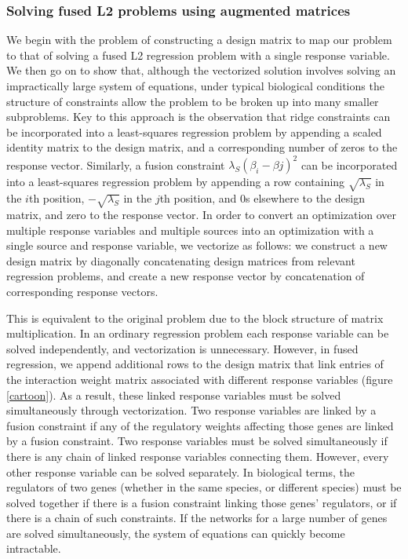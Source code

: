 \documentclass[11pt]{article}
\begin{document}
\subsubsection{Solving fused L2 problems using augmented matrices}
We begin with the problem of constructing a design matrix to map our problem to that of solving a fused L2 regression problem with a single response variable. 
We then go on to show that, although the vectorized solution involves solving an impractically large system of equations, under typical biological conditions the structure of constraints allow the problem to be broken up into many smaller subproblems. 
Key to this approach is the observation that ridge constraints can be incorporated into a least-squares regression problem by appending a scaled identity matrix to the design matrix, and a corresponding number of zeros to the response vector. 
Similarly, a fusion constraint $\lambda_S (\beta_{i} - \beta{j})^2$ can be incorporated into a least-squares regression problem by appending a row containing $\sqrt{\lambda_S}$ in the $i$th position, $-\sqrt{\lambda_S}$ in the $j$th position, and $0$s elsewhere to the design matrix, and zero to the response vector. 
In order to convert an optimization over multiple response variables and multiple sources into an optimization with a single source and response variable, we vectorize as follows: we construct a new design matrix by diagonally concatenating design matrices from relevant regression problems, and create a new response vector by concatenation of corresponding response vectors. 

This is equivalent to the original problem due to the block structure of matrix multiplication. 
In an ordinary regression problem each response variable can be solved independently, and vectorization is unnecessary. 
However, in fused regression, we append additional rows to the design matrix that link entries of the interaction weight matrix associated with different response variables (figure \ref{cartoon}). 
As a result, these linked response variables must be solved simultaneously through vectorization. 
Two response variables are linked by a fusion constraint if any of the regulatory weights affecting those genes are linked by a fusion constraint. 
Two response variables must be solved simultaneously if there is any chain of linked response variables connecting them. 
However, every other response variable can be solved separately. 
In biological terms, the regulators of two genes (whether in the same species, or different species) must be solved together if there is a fusion constraint linking those genes' regulators, or if there is a chain of such constraints. 
If the networks for a large number of genes are solved simultaneously, the system of equations can quickly become intractable. 
\end{document}
